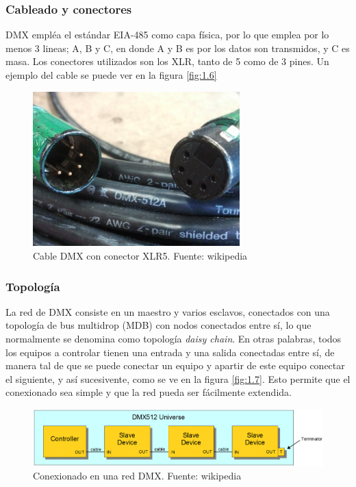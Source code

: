\subsubsection{Cableado y conectores}
DMX empléa el estándar EIA-485 como capa física, por lo que emplea por lo menos 3 lineas; A, B y C, en donde A y B es por los datos son transmidos, y C es masa. Los conectores utilizados son los XLR, tanto de 5 como de 3 pines. Un ejemplo del cable se puede ver en la figura \ref{fig:1.6} \\

\begin{figure}[!ht]
	\centering
	\includegraphics[width=8cm,scale=1]{resources/1_6-cableDMX.jpg}
	\caption{Cable DMX con conector XLR5. Fuente: wikipedia}
	\label{fig:\thefigure}
\end{figure}

\subsubsection{Topología}
La red de DMX consiste en un maestro y varios esclavos, conectados con una topología de bus multidrop (MDB) con nodos conectados entre sí, lo que normalmente se denomina como topología \textit{daisy chain}. En otras palabras, todos los equipos a controlar tienen una entrada y una salida conectadas entre sí, de manera tal de que se puede conectar un equipo y apartir de este equipo conectar el siguiente, y así sucesivente, como se ve en la figura \ref{fig:1.7}. Esto permite que el conexionado sea simple y que la red pueda ser fácilmente extendida.

\begin{figure}[!ht]
	\centering
	\includegraphics[width=15cm,scale=1]{resources/1_7-topologiaDMX.png}
	\caption{Conexionado en una red DMX. Fuente: wikipedia}
	\label{fig:\thefigure}
\end{figure}

